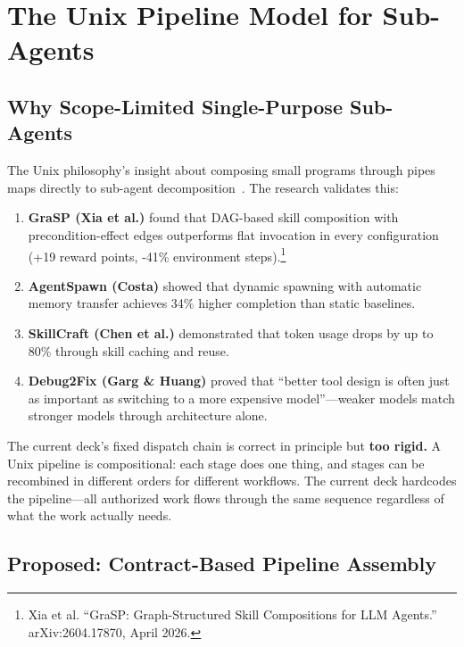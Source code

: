 \documentclass[11pt,a4paper]{article}
\begin{document}
\newpage

\section{The Unix Pipeline Model for Sub-Agents}

\subsection{Why Scope-Limited Single-Purpose Sub-Agents}

The Unix philosophy's insight about composing small programs through pipes maps directly to sub-agent decomposition~\cite{piskala2026unix}.  The research validates this:

\begin{enumerate}[leftmargin=*]
  \item \textbf{GraSP (Xia et al.)} found that DAG-based skill composition with precondition-effect edges outperforms flat invocation in every configuration (+19 reward points, -41\% environment steps).\footnote{Xia et al.  ``GraSP: Graph-Structured Skill Compositions for LLM Agents.''  arXiv:2604.17870, April 2026.}
  \item \textbf{AgentSpawn (Costa)} showed that dynamic spawning with automatic memory transfer achieves 34\% higher completion than static baselines.
  \item \textbf{SkillCraft (Chen et al.)} demonstrated that token usage drops by up to 80\% through skill caching and reuse.
  \item \textbf{Debug2Fix (Garg \& Huang)} proved that ``better tool design is often just as important as switching to a more expensive model''---weaker models match stronger models through architecture alone.
\end{enumerate}

The current deck's fixed dispatch chain is correct in principle but \textbf{too rigid.}  A Unix pipeline is compositional: each stage does one thing, and stages can be recombined in different orders for different workflows.  The current deck hardcodes the pipeline---all authorized work flows through the same sequence regardless of what the work actually needs.

\subsection{Proposed: Contract-Based Pipeline Assembly}
\end{document}
